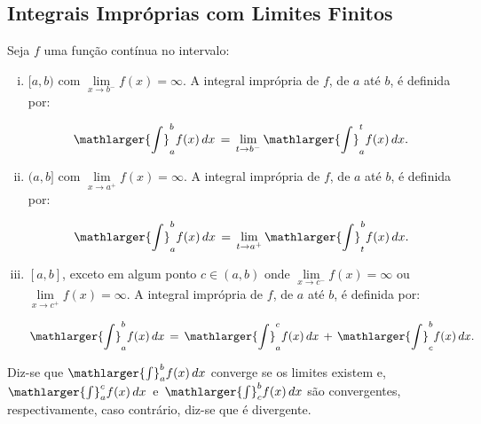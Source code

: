 \cleardoublepage\documentclass[../main.tex]{subfiles}
\begin{document}
\subsection{Integrais Impróprias com Limites Finitos}\hypertarget{LimInf2}{}
\begin{framed}
\begin{definition}\label{def:IntImpLimFinitos}
Seja \(f\) uma função contínua no intervalo:
\begin{enumerate}[i.]
    \item \([a,b)\) com \(\lim\limits_{x\to b^{-}}f(x)=\infty\). A integral imprópria de \(f\), de \(a\) até \(b\), é definida por:

\[ \mathlarger{\int}^{b}_{a} f(x)\,dx\,=\,\lim\limits_{t\to b^{-}} \mathlarger{\int}^{t}_{a} f(x)\,dx. \]
\item \((a,b]\) com \(\lim\limits_{x\to a^{+}}f(x)=\infty\). A integral imprópria de \(f\), de \(a\) até \(b\), é definida por:

\[ \mathlarger{\int}^{b}_{a} f(x)\,dx\,=\,\lim\limits_{t\to a^{+}} \mathlarger{\int}^{b}_{t} f(x)\,dx. \]
\item \([a,b]\), exceto em algum ponto \(c\in (a,b)\) onde \(\lim\limits_{x\to c^{-}}f(x)=\infty\) ou \(\lim\limits_{x\to c^{+}}f(x)=\infty\). A integral imprópria de \(f\), de \(a\) até \(b\), é definida por:

\[ \mathlarger{\int}^{b}_{a} f(x)\,dx\,=\,\mathlarger{\int}^{c}_{a} f(x)\,dx\,+\, \mathlarger{\int}^{b}_{c} f(x)\,dx. \]
\end{enumerate}
Diz-se que \(\mathlarger{\int}^{b}_{a} f(x)\,dx\) converge se os limites existem e, \(\mathlarger{\int}^{c}_{a} f(x)\,dx\,\) e \(\,\mathlarger{\int}^{b}_{c} f(x)\,dx\) são convergentes, respectivamente, caso contrário, diz-se que é divergente.
\end{definition}
\end{framed}
\end{document}
